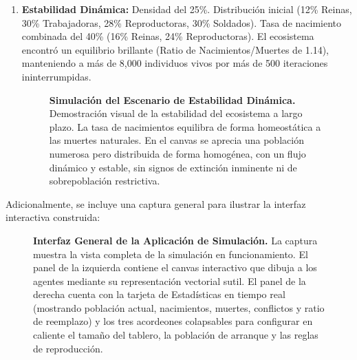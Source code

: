 \documentclass[12pt,a4paper]{article}
\begin{document}
\begin{enumerate}
    \item \textbf{Estabilidad Dinámica:} Densidad del 25\%. Distribución inicial (12\% Reinas, 30\% Trabajadoras, 28\% Reproductoras, 30\% Soldados). Tasa de nacimiento combinada del 40\% (16\% Reinas, 24\% Reproductoras). El ecosistema encontró un equilibrio brillante (Ratio de Nacimientos/Muertes de 1.14), manteniendo a más de 8,000 individuos vivos por más de 500 iteraciones ininterrumpidas.

    \begin{figure}[H]
        \centering
        \caption{\textbf{Simulación del Escenario de Estabilidad Dinámica.} Demostración visual de la estabilidad del ecosistema a largo plazo. La tasa de nacimientos equilibra de forma homeostática a las muertes naturales. En el canvas se aprecia una población numerosa pero distribuida de forma homogénea, con un flujo dinámico y estable, sin signos de extinción inminente ni de sobrepoblación restrictiva.}
        \label{fig:captura_estabilidad}
    \end{figure}

\end{enumerate}

Adicionalmente, se incluye una captura general para ilustrar la interfaz interactiva construida:

\begin{figure}[H]
    \centering
    \caption{\textbf{Interfaz General de la Aplicación de Simulación.} La captura muestra la vista completa de la simulación en funcionamiento. El panel de la izquierda contiene el canvas interactivo que dibuja a los agentes mediante su representación vectorial sutil. El panel de la derecha cuenta con la tarjeta de Estadísticas en tiempo real (mostrando población actual, nacimientos, muertes, conflictos y ratio de reemplazo) y los tres acordeones colapsables para configurar en caliente el tamaño del tablero, la población de arranque y las reglas de reproducción.}
    \label{fig:captura_interfaz}
\end{figure}
\end{document}
